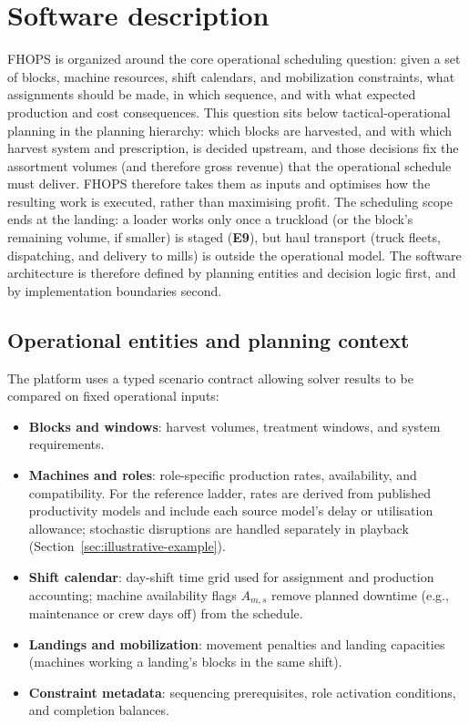 \section{Software description}
\label{sec:software-description}

FHOPS is organized around the core operational scheduling question: given a set of blocks, machine resources, shift calendars, and mobilization constraints, what assignments should be made, in which sequence, and with what expected production and cost consequences. This question sits below tactical-operational planning in the planning hierarchy: which blocks are harvested, and with which harvest system and prescription, is decided upstream, and those decisions fix the assortment volumes (and therefore gross revenue) that the operational schedule must deliver. FHOPS therefore takes them as inputs and optimises how the resulting work is executed, rather than maximising profit. The scheduling scope ends at the landing: a loader works only once a truckload (or the block's remaining volume, if smaller) is staged (\textbf{E9}), but haul transport (truck fleets, dispatching, and delivery to mills) is outside the operational model. The software architecture is therefore defined by planning entities and decision logic first, and by implementation boundaries second.

\subsection{Operational entities and planning context}
The platform uses a typed scenario contract allowing solver results to be compared on fixed operational inputs:
\begin{itemize}
  \item \textbf{Blocks and windows}: harvest volumes, treatment windows, and system requirements.
  \item \textbf{Machines and roles}: role-specific production rates, availability, and compatibility. For the reference ladder, rates are derived from published productivity models and include each source model's delay or utilisation allowance; stochastic disruptions are handled separately in playback (Section~\ref{sec:illustrative-example}).
  \item \textbf{Shift calendar}: day-shift time grid used for assignment and production accounting; machine availability flags $A_{m,s}$ remove planned downtime (e.g., maintenance or crew days off) from the schedule.
  \item \textbf{Landings and mobilization}: movement penalties and landing capacities (machines working a landing's blocks in the same shift).
  \item \textbf{Constraint metadata}: sequencing prerequisites, role activation conditions, and completion balances.
\end{itemize}

